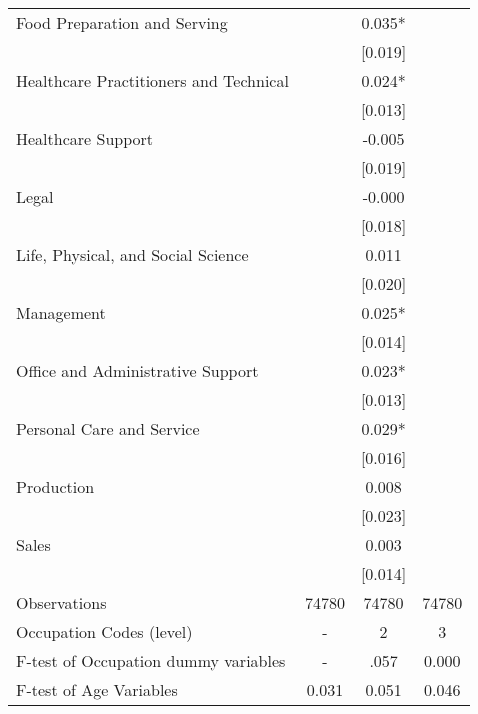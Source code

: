 \documentclass[10pt,letterpaper,subeqn]{beamer}
\begin{document}
\begin{frame}
\begin{table}[htbp]
{\begin{tabular}{l*{3}{c}}
Food Preparation and Serving &               &       0.035*  &               \\
                    &               &     [0.019]   &               \\
Healthcare Practitioners and Technical &               &       0.024*  &               \\
                    &               &     [0.013]   &               \\
Healthcare Support &               &      -0.005   &               \\
                    &               &     [0.019]   &               \\
Legal &               &      -0.000   &               \\
                    &               &     [0.018]   &               \\
Life, Physical, and Social Science &               &       0.011   &               \\
                    &               &     [0.020]   &               \\
Management &               &       0.025*  &               \\
                    &               &     [0.014]   &               \\
Office and Administrative Support &               &       0.023*  &               \\
                    &               &     [0.013]   &               \\
Personal Care and Service &               &       0.029*  &               \\
                    &               &     [0.016]   &               \\
Production &               &       0.008   &               \\
                    &               &     [0.023]   &               \\
Sales &               &       0.003   &               \\
                    &               &     [0.014]   &               \\
\midrule
Observations        &       74780   &       74780   &       74780   \\
Occupation Codes (level) &-&2&3\\
F-test of Occupation dummy variables&-&.057&0.000\\
F-test of Age Variables&0.031&0.051&0.046\\ \bottomrule
\end{tabular}}\end{table}
\end{frame}
\end{document}

